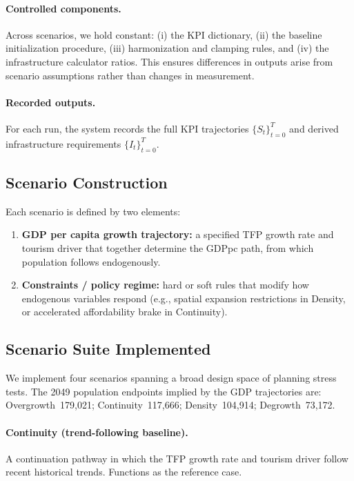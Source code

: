 \documentclass[urbansci,article,submit,pdftex,moreauthors]{Definitions/mdpi}
\begin{document}
\paragraph{Controlled components.}
Across scenarios, we hold constant: (i) the KPI dictionary, (ii) the baseline
initialization procedure, (iii) harmonization and clamping rules, and (iv) the
infrastructure calculator ratios. This ensures differences in outputs arise from
scenario assumptions rather than changes in measurement.

\paragraph{Recorded outputs.}
For each run, the system records the full KPI trajectories
$\{S_t\}_{t=0}^{T}$ and derived infrastructure requirements
$\{I_t\}_{t=0}^{T}$.

\subsection{Scenario Construction}
\label{subsec:scenario_construction}

Each scenario is defined by two elements:
\begin{enumerate}
\item \textbf{GDP per capita growth trajectory:} a specified TFP growth rate
      and tourism driver that together determine the GDPpc path, from which
      population follows endogenously.
\item \textbf{Constraints / policy regime:} hard or soft rules that modify how
      endogenous variables respond (e.g., spatial expansion restrictions in
      Density, or accelerated affordability brake in Continuity).
\end{enumerate}

\subsection{Scenario Suite Implemented}
\label{subsec:scenario_suite}

We implement four scenarios spanning a broad design space of planning stress
tests. The 2049 population endpoints implied by the GDP trajectories are:
Overgrowth~179{,}021; Continuity~117{,}666; Density~104{,}914;
Degrowth~73{,}172.

\paragraph{Continuity (trend-following baseline).}
A continuation pathway in which the TFP growth rate and tourism driver follow
recent historical trends. Functions as the reference case.
\end{document}
